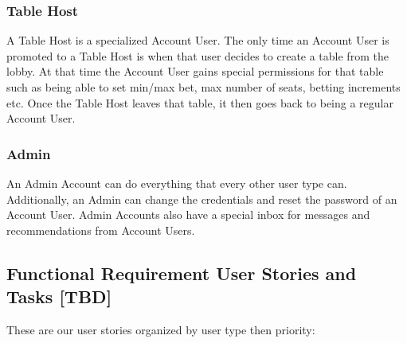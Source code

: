 \subsubsection{Table Host}
A Table Host is a specialized Account User. The only time an Account User is promoted to a Table Host is when that user decides to create a table from the lobby. At that time the Account User gains special permissions for that table such as being able to set min/max bet, max number of seats, betting increments etc. Once the Table Host leaves that table, it then goes back to being a regular Account User.

\subsubsection{Admin}
An Admin Account can do everything that every other user type can. Additionally, an Admin can change the credentials and reset the password of an Account User. Admin Accounts also have a special inbox for messages and recommendations from Account Users.

\subsection{Functional Requirement User Stories and Tasks \textbf{[TBD]}}





These are our user stories organized by user type then priority: \\

